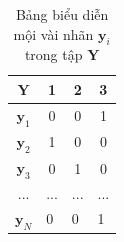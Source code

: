 \documentclass{article}
\begin{document}
\begin{table}[h]
	\centering
	\begin{tabular}{|c|c|c|c|}
		\hline
		$\mathbf{Y}$                           & 1                      & 2                       & 3                       \\ \hline
		$\mathbf{y}_1$                         & 0                      & 0                       & 1                       \\ \hline
		$\mathbf{y}_2$                         & 1                      & 0                       & 0                       \\ \hline
		$\mathbf{y}_3$                         & 0                      & 1                       & 0                       \\ \hline
		...                                    & ...                    & ...                     & ...                     \\ \hline
		\multicolumn{1}{|l|}{$\mathbf{y}_N$}   & \multicolumn{1}{l|}{0} & \multicolumn{1}{l|}{0}  & \multicolumn{1}{l|}{1}  \\ \hline
	\end{tabular}
	\caption{Bảng biểu diễn mội vài nhãn $\mathbf{y}_i$ trong tập $\mathbf{Y}$}
	\label{tab:tbexample}
	\end{table}
	\newpage
\end{document}
